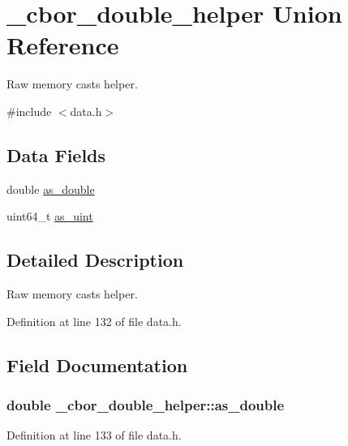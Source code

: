 \hypertarget{union__cbor__double__helper}{\section{\-\_\-cbor\-\_\-double\-\_\-helper Union Reference}
\label{union__cbor__double__helper}
}


Raw memory casts helper.  




{\ttfamily \#include $<$data.\-h$>$}

\subsection*{Data Fields}
\begin{DoxyCompactItemize}
\item 
double \hyperlink{union__cbor__double__helper_a51f93c8fae90168e51b1be0517e1ada0}{as\-\_\-double}
\item 
uint64\-\_\-t \hyperlink{union__cbor__double__helper_a247647c22dd8248e513c37b0b339b856}{as\-\_\-uint}
\end{DoxyCompactItemize}


\subsection{Detailed Description}
Raw memory casts helper. 

Definition at line 132 of file data.\-h.



\subsection{Field Documentation}
\hypertarget{union__cbor__double__helper_a51f93c8fae90168e51b1be0517e1ada0}{
\subsubsection[{as\-\_\-double}]{\setlength{\rightskip}{0pt plus 5cm}double \-\_\-cbor\-\_\-double\-\_\-helper\-::as\-\_\-double}}\label{union__cbor__double__helper_a51f93c8fae90168e51b1be0517e1ada0}


Definition at line 133 of file data.\-h.

